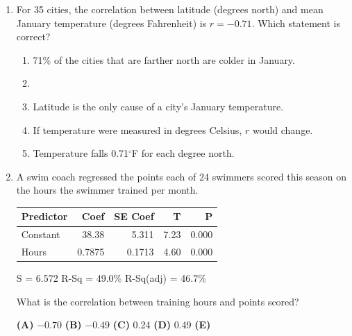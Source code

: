\documentclass[12pt]{article}
\begin{document}
\begin{enumerate}[leftmargin=1.9em, itemsep=0.13in]
  \boxguard[11]
  \item For 35 cities, the correlation between latitude (degrees north) and mean January
        temperature (degrees Fahrenheit) is $r = -0.71$. Which statement is correct?
        \begin{enumerate}[label=\textbf{(\Alph*)}, leftmargin=2.2em, itemsep=2pt]
          \item 71\% of the cities that are farther north are colder in January.
          \item {}\\
          \item Latitude is the only cause of a city's January temperature.
          \item If temperature were measured in degrees Celsius, $r$ would change.
          \item Temperature falls 0.71$^\circ$F for each degree north.\hfill{}\rule[-0.2in]{0pt}{0.48in}
        \end{enumerate}

  \boxguard[11]
  \item A swim coach regressed the points each of 24 swimmers scored this season on the hours
        the swimmer trained per month.

        \vspace{2pt}
        {\centering\footnotesize\ttfamily
        \begin{tabular}{@{} l r r r r @{}}
        Predictor & Coef & SE Coef & T & P \\ \hline
        Constant & 38.38 & 5.311 & 7.23 & 0.000 \\
        Hours & 0.7875 & 0.1713 & 4.60 & 0.000 \\
        \end{tabular}\par
        S = 6.572 \quad R-Sq = 49.0\% \quad R-Sq(adj) = 46.7\%\par}
        \vspace{2pt}

        What is the correlation between training hours and points scored?\hfill{}\rule[-0.2in]{0pt}{0.48in}
        \par\vspace{3pt}\noindent
        \hspace{1.2em}\textbf{(A)} $-0.70$ \hfill \textbf{(B)} $-0.49$ \hfill
        \textbf{(C)} 0.24 \hfill \textbf{(D)} 0.49 \hfill \textbf{(E)} 


\end{enumerate}
\end{document}
